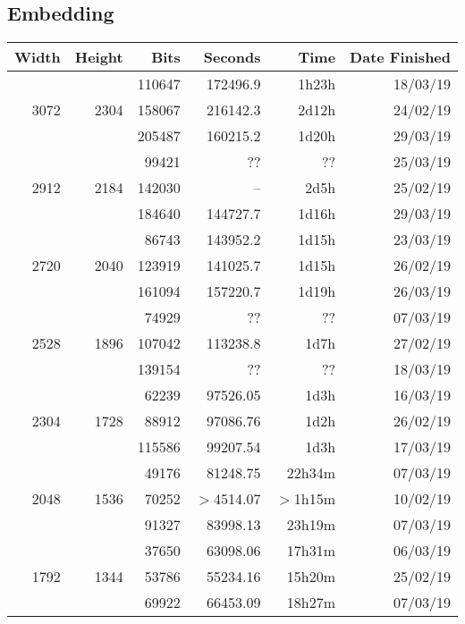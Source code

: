 \subsection{Embedding}
  \begin{center}
  \begin{tabular}{ r r r | r r r }
  Width & Height & Bits & Seconds & Time & Date Finished \\ \hline
  \multirow{3}{*}{3072} & \multirow{3}{*}{2304} & 110647 & 172496.9 & 1h23h & 18/03/19 \\
  & & 158067 & 216142.3 & 2d12h & 24/02/19 \\
  & & 205487 & 160215.2 & 1d20h & 29/03/19 \\
  \hline
  \multirow{3}{*}{2912} & \multirow{3}{*}{2184} & 99421 & ?? & ?? & 25/03/19 \\ %
  & & 142030 & -- & 2d5h & 25/02/19 \\
  & & 184640 & 144727.7 & 1d16h & 29/03/19 \\
  \hline
  \multirow{3}{*}{2720} & \multirow{3}{*}{2040} & 86743 & 143952.2 & 1d15h & 23/03/19 \\
  & & 123919 & 141025.7 & 1d15h & 26/02/19 \\
  & & 161094 & 157220.7 & 1d19h & 26/03/19 \\
  \hline
  \multirow{3}{*}{2528} & \multirow{3}{*}{1896} & 74929 & ?? & ?? & 07/03/19 \\ %
  & & 107042 & 113238.8 & 1d7h & 27/02/19 \\
  & & 139154 & ?? & ?? & 18/03/19 \\ %
  \hline
  \multirow{3}{*}{2304} & \multirow{3}{*}{1728} & 62239 & 97526.05 & 1d3h & 16/03/19 \\
  & & 88912 & 97086.76 & 1d2h & 26/02/19 \\
  & & 115586 & 99207.54 & 1d3h & 17/03/19 \\
  \hline
  \multirow{3}{*}{2048} & \multirow{3}{*}{1536} & 49176 & 81248.75 & 22h34m & 07/03/19 \\
  & & 70252 & $>$4514.07 & $>$1h15m & 10/02/19 \\
  & & 91327 & 83998.13 & 23h19m & 07/03/19 \\
  \hline
  \multirow{3}{*}{1792} & \multirow{3}{*}{1344} & 37650 & 63098.06 & 17h31m & 06/03/19 \\
  & & 53786 & 55234.16 & 15h20m & 25/02/19 \\
  & & 69922 & 66453.09 & 18h27m & 07/03/19 \\

\end{tabular}
\end{center}
